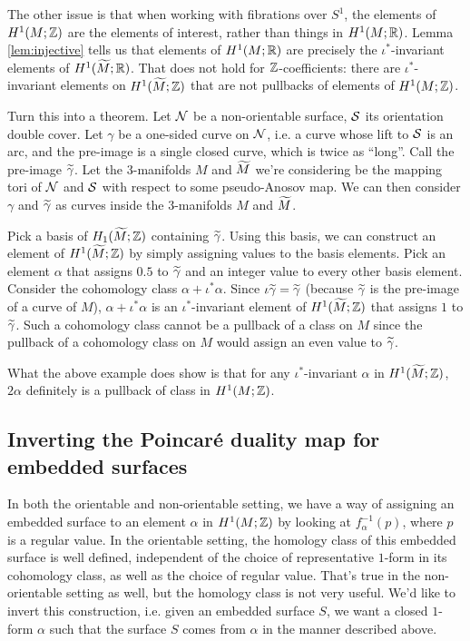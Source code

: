 The other issue is that when working with fibrations over $S^1$, the elements of $H^1(M; \mathbb{Z})$ are
the elements of interest, rather than things in $H^1(M; \mathbb{R})$. Lemma \ref{lem:injective} tells us
that elements of $H^1(M; \mathbb{R})$ are precisely the $\iota^{\ast}$-invariant elements of
$H^1(\widetilde{M}; \mathbb{R})$. That does not hold for $\mathbb{Z}$-coefficients: there are $\iota^{\ast}$-invariant
elements on $H^1(\widetilde{M}; \mathbb{Z})$ that are not pullbacks of elements of $H^1(M; \mathbb{Z})$.
\begin{example}
  {\color{red} Turn this into a theorem.}
  Let $\mathcal{N}$ be a non-orientable surface, $\mathcal{S}$ its orientation double cover. Let $\gamma$ be a
  one-sided curve on $\mathcal{N}$, i.e. a curve whose lift to $\mathcal{S}$ is an arc, and the pre-image is a
  single closed curve, which is twice as ``long''. Call the pre-image $\widetilde{\gamma}$. Let the
  $3$-manifolds $M$ and $\widetilde{M}$ we're considering be the mapping tori of $\mathcal{N}$ and $\mathcal{S}$ with
  respect to some pseudo-Anosov map. We can then consider $\gamma$ and $\widetilde{\gamma}$ as curves
  inside the $3$-manifolds $M$ and $\widetilde{M}$.

  Pick a basis of $H_1(\widetilde{M}; \mathbb{Z})$ containing $\widetilde{\gamma}$. Using this basis, we can construct an
  element of $H^1(\widetilde{M}; \mathbb{Z})$ by simply assigning values to the basis elements. Pick an element
  $\alpha$ that assigns $0.5$ to $\widetilde{\gamma}$ and an integer value to every other basis
  element. Consider the cohomology class $\alpha + \iota^{\ast}\alpha$. Since
  $\iota \widetilde{\gamma} = \widetilde{\gamma}$ (because $\widetilde{\gamma}$ is the pre-image of a curve of $M$),
  $\alpha + \iota^{\ast}\alpha$ is an $\iota^{\ast}$-invariant element of $H^1(\widetilde{M}; \mathbb{Z})$ that
  assigns $1$ to $\widetilde{\gamma}$. Such a cohomology class cannot be a pullback of a class on $M$ since
  the pullback of a cohomology class on $M$ would assign an even value to $\widetilde{\gamma}$.
\end{example}

What the above example does show is that for any $\iota^{\ast}$-invariant $\alpha$ in
$H^1(\widetilde{M}; \mathbb{Z})$, $2\alpha$ definitely is a pullback of class in $H^1(M; \mathbb{Z})$.

\subsection{Inverting the Poincar\'e duality map for embedded surfaces}
\label{sec:invert-poincare}

In both the orientable and non-orientable setting, we have a way of assigning an embedded surface
to an element $\alpha$ in $H^1(M; \mathbb{Z})$ by looking at $f_{\alpha}^{-1}(p)$, where $p$ is a regular
value. In the orientable setting, the homology class of this embedded surface is well defined,
independent of the choice of representative $1$-form in its cohomology class, as well as the choice
of regular value. That's true in the non-orientable setting as well, but the homology class is not
very useful. We'd like to invert this construction, i.e. given an embedded surface $S$, we want a
closed $1$-form $\alpha$ such that the surface $S$ comes from $\alpha$ in the manner described
above.

